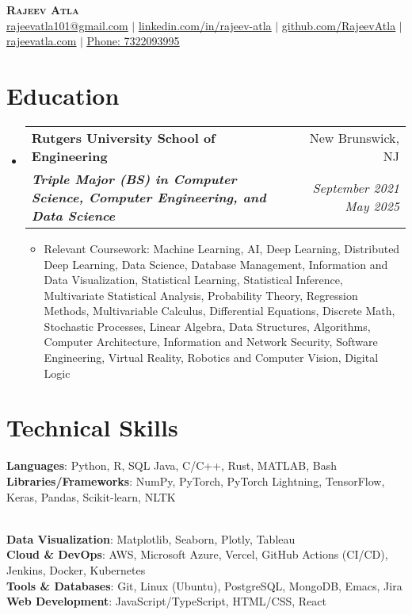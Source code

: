 \documentclass[letterpaper, 11pt]{article}
\makeatletter
\newcommand{\resumeSubheading}[4]{ %
  \vspace{-2pt}\item
    \begin{tabular*}{0.99\textwidth}[t]{l@{\extracolsep{\fill}}r}
      \textbf{#1} & #2 \\
      \textit{\small#3} & \textit{\small #4} \\
    \end{tabular*}\vspace{-7pt}
}
\newcommand{\resumeSubHeadingListStart}{\begin{itemize}[leftmargin=0.15in, label={}]}
\newcommand{\resumeSubHeadingListEnd}{\end{itemize}}
\makeatother
\begin{document}


\begin{center}
    \textbf{\Huge \scshape Rajeev Atla} \\
    \href{mailto:rajeevatla101@gmail.com}{\underline{rajeevatla101@gmail.com}} $|$ 
    \href{https://www.linkedin.com/in/rajeev-atla/}{\underline{linkedin.com/in/rajeev-atla}} $|$
    \href{https://github.com/RajeevAtla}{\underline{github.com/RajeevAtla}} $|$
    \href{https://rajeevatla.com}{\underline{rajeevatla.com}} $|$
    \href{tel:7322093995}{\underline{Phone: 7322093995}}
\end{center}


\section{Education}
  \resumeSubHeadingListStart{}
    \resumeSubheading %
      {Rutgers University \textendash{} School of Engineering}{New Brunswick, NJ}
      {\textbf{Triple Major (BS) in Computer Science, Computer Engineering, and Data Science}}{September 2021 \textendash{} May 2025}
      \begin{itemize}[leftmargin=0.25in, label={}]
      \item Relevant Coursework: Machine Learning, AI, Deep Learning, Distributed Deep Learning, Data Science, Database Management, Information and Data Visualization, Statistical Learning, Statistical Inference, Multivariate Statistical Analysis, Probability Theory, Regression Methods, Multivariable Calculus, Differential Equations, Discrete Math, Stochastic Processes, Linear Algebra, Data Structures, Algorithms, Computer Architecture, Information and Network Security, Software Engineering, Virtual Reality, Robotics and Computer Vision, Digital Logic \\
\end{itemize}
  \resumeSubHeadingListEnd{}

\vspace{-35pt}

\section{Technical Skills}
 \begin{itemize}[leftmargin=0.25in, label={}]
    \small{\item{
     \textbf{Languages}{: Python, R, SQL Java, C/C++, Rust, MATLAB, Bash} \\
     \textbf{Libraries/Frameworks}{: NumPy, PyTorch, PyTorch Lightning, TensorFlow, Keras, Pandas, Scikit-learn, NLTK}
    }} \\
    \textbf{Data Visualization}{: Matplotlib, Seaborn, Plotly, Tableau} \\
    \textbf{Cloud \& DevOps}{: AWS, Microsoft Azure, Vercel, GitHub Actions (CI/CD), Jenkins, Docker, Kubernetes} \\
     \textbf{Tools \& Databases}{: Git, Linux (Ubuntu), PostgreSQL, MongoDB,  Emacs, Jira} \\
     \textbf{Web Development}{: JavaScript/TypeScript, HTML/CSS, React} 
 \end{itemize}
\end{document}
